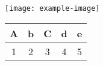 \documentclass{article}
\begin{document}
\begin{figure}
  \begin{minipage}[b]{.45\linewidth}
    \centering
    \texttt{[image: example-image]}
  \end{minipage}\hfill
  \begin{minipage}[b]{.45\linewidth}
    \centering
    \begin{tabular}{ *{5}{c} }
      A & b & C & d & e \\
      \hline
      1 & 2 & 3 & 4 & 5
    \end{tabular}
  \end{minipage}
\end{figure}
\end{document}
